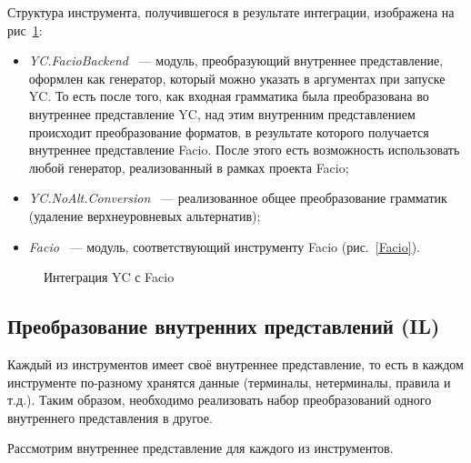 \documentclass[14pt]{matmex-diploma}
\begin{document}
Структура инструмента, получившегося в результате интеграции, изображена на рис~\ref{YC_after}:
\begin{itemize}
\item
\textit{YC.FacioBackend} ~--- модуль, преобразующий внутреннее представление, оформлен как генератор, который можно указать в аргументах при запуске YC. То есть после того, как входная грамматика была преобразована во внутреннее представление YC, над этим внутренним представлением происходит преобразование форматов, в результате которого получается внутреннее представление Facio. После этого есть возможность использовать любой генератор, реализованный в рамках проекта Facio;
\item
\textit{YC.NoAlt.Conversion} ~--- реализованное общее преобразование грамматик (удаление верхнеуровневых альтернатив);
\item
\textit{Facio} ~--- модуль, соответствующий инструменту Facio (рис.~\ref{Facio}).
\end{itemize}

\begin{figure}[h]
  \caption{Интеграция YC с Facio}
  \label{YC_after}
\end{figure}
\newpage
\subsection{Преобразование внутренних представлений (IL)}
Каждый из инструментов имеет своё внутреннее представление, то есть в каждом инструменте по-разному хранятся данные (терминалы, нетерминалы, правила и т.д.). Таким образом, необходимо реализовать набор преобразований одного внутреннего представления в другое.

Рассмотрим внутреннее представление для каждого из инструментов.
\end{document}
